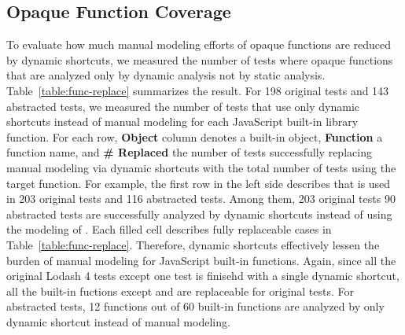 \subsection{Opaque Function Coverage}
To evaluate how much manual modeling efforts of opaque functions
are reduced by dynamic shortcuts, we measured the number of tests where
opaque functions that are analyzed only by dynamic analysis not by
static analysis.  Table~\ref{table:func-replace} summarizes the result.
For 198 original tests and 143 abstracted tests, we measured the
number of tests that use only dynamic shortcuts instead of manual modeling
for each JavaScript built-in library function.  For each row,
\textbf{Object} column denotes a built-in object, \textbf{Function} a function
name, and \textbf{\# Replaced} the number of tests successfully replacing manual
modeling via dynamic shortcuts with the total number of tests using the target function.
For example, the first row in the left side describes that  is used in
203 original tests and 116 abstracted tests.  Among them, 203 original
tests 90 abstracted tests are successfully analyzed by dynamic shortcuts
instead of using the modeling of .  Each filled cell describes
fully replaceable cases in Table~\ref{table:func-replace}.  Therefore, dynamic
shortcuts effectively lessen the burden of manual modeling for JavaScript
built-in functions.  Again, since all the original Lodash 4 tests except one
test is finisehd with a single dynamic shortcut, all the built-in fuctions
except  and  are replaceable
for original tests.  For abstracted tests, 12 functions out of 60 built-in
functions are analyzed by only dynamic shortcut instead of manual modeling.
